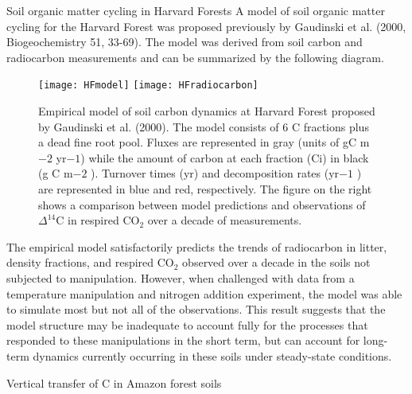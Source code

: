\documentclass[final,hyperref={pdfpagelabels=false}, professionalmath, mathserif, 11pt]{beamer}
\begin{document}
\begin{frame}
\begin{columns}
  
  
  \begin{column}{.48\textwidth}
    \begin{minipage}[T]{.95\textwidth}
      \begin{block}{Soil organic matter cycling in Harvard Forests}
      A model of soil organic matter cycling for the Harvard Forest was proposed previously by Gaudinski et al. (2000, Biogeochemistry 51, 33-69). The model was derived from soil carbon and radiocarbon measurements and can be summarized by the following diagram. 
	\begin{figure}
	  \texttt{[image: HFmodel]}
	  \texttt{[image: HFradiocarbon]}
	  \caption{Empirical model of soil carbon dynamics at Harvard Forest proposed by Gaudinski et al. (2000). The model consists of 6 C fractions plus a dead fine root pool. Fluxes are represented in gray (units of gC m${-2}$ yr${-1}$) while the amount of carbon at each fraction (Ci) in black (g C m${-2}$ ). Turnover times (yr) and decomposition rates (yr${-1}$ ) are represented in blue and red, respectively. The figure on the right shows a comparison between model predictions and observations of $\Delta^{14}$C in respired CO$_2$ over a decade of measurements. }
	\end{figure}
	
	The empirical model satisfactorily predicts the trends of radiocarbon in litter, density fractions, and respired CO$_2$ observed over a decade in the soils not subjected to manipulation. However, when challenged with data from a temperature manipulation and nitrogen addition experiment, the model was able to simulate most but not all of the observations. This result suggests that the model structure may be inadequate to account fully for the processes that responded to these manipulations in the short term, but can account for long-term dynamics currently occurring in these soils under steady-state conditions.
      \end{block}
      \begin{block}{Vertical transfer of C in Amazon forest soils}
      

\end{block}
\end{minipage}
\end{column}
\end{columns}
\end{frame}
\end{document}
